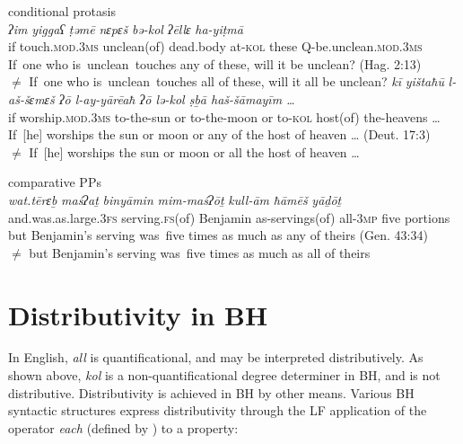 \documentclass[output=paper]{langsci/langscibook}
\begin{document}
\ea%
    conditional protasis\label{ex:doron:43}\\
    \ea
    \gll \textit{ʔim}    \textit{yiggaʕ}                 \textit{ṭəmē}             \textit{nɛpɛš}          \textit{bə-kol}   \textit{ʔēllɛ}  \textit{ha-yiṭmā}\\
         if       touch.\textsc{mod.3ms}   unclean(of)  dead.body  at-\textsc{kol} these  Q-be.unclean\textsc{.mod.3ms}   \\
    \glt If~one who is~unclean~touches any of these, will it be unclean?  (Hag. 2:13)\\${\neq}$   If~one who is~unclean~touches all of these, will it all be unclean? 
    \ex  
    \gll \textit{kī} \textit{yištaħū}                    \textit{l-aš{}-šɛmɛš  ʔō  l-ay-yārēaħ  ʔō   lə-kol   ṣḇā         haš{}-šāmayīm  …}\\
         if  worship.\textsc{mod.3ms}  to-the-sun  or  to-the-moon  or  to-\textsc{kol} host(of) the-heavens  \textsc{…} \\
    \glt If~[he] worships the sun or moon or any of the host of heaven … (Deut. 17:3)\\${\neq}$   If~[he] worships the sun or moon or all the host of heaven … 
    \z
\z

\ea%
comparative PPs\label{ex:doron:44}\\
\gll  \textit{wat.tērɛḇ}                     \textit{ma}\textit{ś}\textit{ʔaṯ}           \textit{binyāmin}   \textit{mim-ma}\textit{ś}\textit{ʔōṯ}      \textit{kull-ām} \textit{ħāmēš} \textit{yāḏōṯ}\\
and.was.as.large.3\textsc{fs}  serving.\textsc{fs}(of) Benjamin  as-servings(of) all-\textsc{3mp}  five     portions\\
\glt   but Benjamin’s serving was~five times as much as any of theirs (Gen. 43:34)\\${\neq}$ but Benjamin’s serving was~five times as much as all of theirs
\z

\section{Distributivity in BH}%

In English, \textit{all} is quantificational, and may be interpreted distributively.  \linebreak As shown above, \textit{kol} is a non-quantificational degree determiner in BH, and is not distributive. Distributivity is achieved in BH by other means. Various BH syntactic structures express distributivity through the LF application of the operator \textit{each} (defined by \citealt{Link1987}) to a property:
\end{document}
